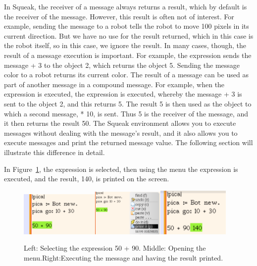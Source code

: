 \documentclass[a4paper,10pt,twoside]{book}
\begin{document}
In Squeak, the receiver of a message always returns a result, which by default is the 
receiver of the message. However, this result is often not of interest. For example, sending the 
message  to a robot tells the robot to move 100 pixels in its current direction. But we 
have no use for the result returned, which in this case is the robot itself, so in this case, we 
ignore the result. In many cases, though, the result of a message execution is important. For 
example, the expression  sends the message + 3 to the object 2, which returns the object 
5. Sending the message color to a robot returns its current color. The result of a message can 
be used as part of another message in a compound message. For example, when the expression 
 is executed, the expression  is executed, whereby the message + 3 is sent 
to the object 2, and this returns 5. The result 5 is then used as the object to which a second 
message, * 10, is sent. Thus 5 is the receiver of the message, and it then returns the result 50. 
The Squeak environment allows you to execute messages without dealing with the message’s result, 
and it also allows you to execute messages and print the returned message value. 
The following section will illustrate this difference in detail. 



In Figure~\ref{fig:printitMenu}, the expression  is selected, then using the menu the expression is 
executed, and the result, 140, is printed on the screen. 

\begin{figure}[h]
\includegraphics[width=3.8cm]{selectingExp}\hfill \includegraphics[width=3.5cm]{selectMenu}\hfill\includegraphics[width=3.5cm]{resultExpression}
\caption{Left: Selecting the expression 50 + 90. Middle: Opening the menu.Right:Executing 
the message and having the result printed.\label{fig:printitMenu}}
\end{figure}
\end{document}
